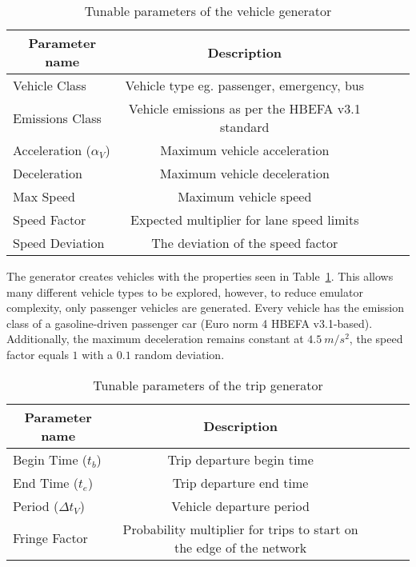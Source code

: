 \begin{table}[h!]
    \centering
    \caption{Tunable parameters of the vehicle generator}
    \label{table:veh_params}
    \begin{tabular}{@{} l *4c @{}}
        \toprule
        \multicolumn{1}{c}{Parameter name} & Description \\ 
        \midrule
        Vehicle Class  & Vehicle type eg. passenger, emergency, bus \\
        Emissions Class  & Vehicle emissions as per the HBEFA v3.1 standard \\
        Acceleration ($\alpha_V$)  & Maximum vehicle acceleration \\
        Deceleration  & Maximum vehicle deceleration \\
        Max Speed  & Maximum vehicle speed \\
        Speed Factor  & Expected multiplier for lane speed limits \\
        Speed Deviation  & The deviation of the speed factor \\
         \bottomrule
    \end{tabular}
\end{table}

The generator creates vehicles with the properties seen in Table~\ref{table:veh_params}. This allows many different vehicle types to be explored, however, to reduce emulator complexity, only passenger vehicles are generated. Every vehicle has the emission class of a gasoline-driven passenger car (Euro norm 4 HBEFA v3.1-based). Additionally, the maximum deceleration remains constant at $4.5~m/s^2$, the speed factor equals $1$ with a $0.1$ random deviation.

\begin{table}[h!]
    \centering
    \caption{Tunable parameters of the trip generator}
    \label{table:trip_params}
    \begin{tabular}{@{} l *4c @{}}
        \toprule
        \multicolumn{1}{c}{Parameter name} & Description \\ 
        \midrule
        Begin Time ($t_b$)  & Trip departure begin time\\
        End Time ($t_e$)  & Trip departure end time \\
        Period ($\Delta t_V$) & Vehicle departure period \\
        Fringe Factor & Probability multiplier for trips to start on the edge of the network  \\
        \bottomrule
    \end{tabular}
\end{table}

